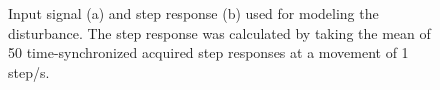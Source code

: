 \begin{figure}[h!]
  \centering %
  \qquad
  \caption{\label{fig:stepinout} Input signal (a) and step response (b) used for modeling the disturbance. The step response was calculated by taking the mean of 50 time-synchronized acquired step responses at a movement of 1 step/s.}
\end{figure}

